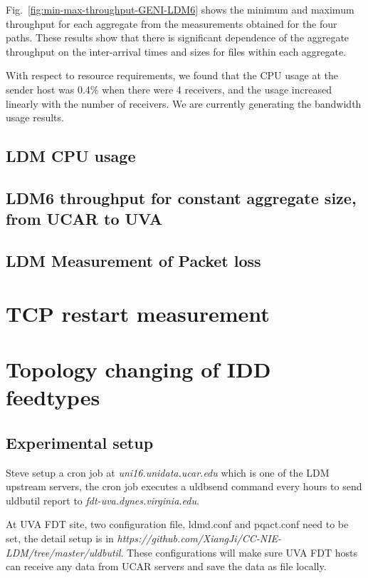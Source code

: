 Fig.~\ref{fig:min-max-throughput-GENI-LDM6} shows the minimum and maximum throughput for each aggregate
from the measurements obtained for the four paths. These results show that there is significant dependence of
the aggregate throughput on the inter-arrival times and sizes for files within each aggregate.

With respect to resource requirements, we found that the CPU usage at the sender host was 0.4\% 
when there were 4 receivers, and the usage increased linearly with the number of receivers. We are currently generating the bandwidth usage results.

\subsection{LDM CPU usage}

\subsection{LDM6 throughput for constant aggregate size, from UCAR to UVA}

\subsection{LDM Measurement of Packet loss}

\section{TCP restart measurement}

\section{Topology changing of IDD feedtypes}
\subsection{Experimental setup}
Steve setup a cron job at \emph{uni16.unidata.ucar.edu} which is one of the LDM upstream servers, the cron job executes a uldbsend command every hours to send uldbutil report to \emph{fdt-uva.dynes.virginia.edu}.

At UVA FDT site, two configuration file, ldmd.conf and pqact.conf need to be set, the detail setup is in \emph{https://github.com/XiangJi/CC-NIE-LDM/tree/master/uldbutil}. These configurations will make sure UVA FDT hosts can receive any data from UCAR servers and save the data as file locally. 

